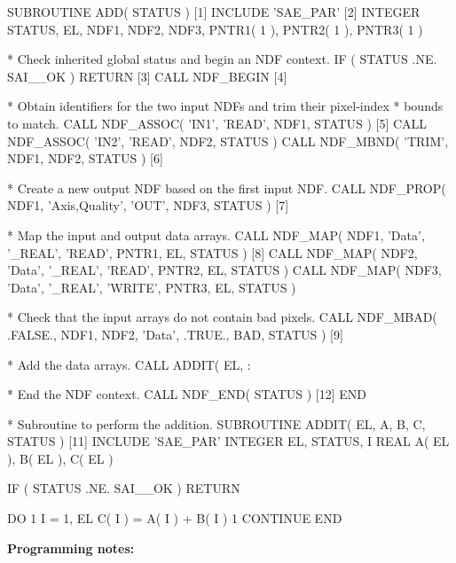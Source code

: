\documentclass[twoside,11pt,nolof]{starlink}
\begin{document}
\small
\begin{terminalv}
      SUBROUTINE ADD( STATUS )                                 [1]
      INCLUDE 'SAE_PAR'                                        [2]
      INTEGER STATUS, EL, NDF1, NDF2, NDF3, PNTR1( 1 ), PNTR2( 1 ), PNTR3( 1 )

*  Check inherited global status and begin an NDF context.
      IF ( STATUS .NE. SAI__OK ) RETURN                        [3]
      CALL NDF_BEGIN                                           [4]

*  Obtain identifiers for the two input NDFs and trim their pixel-index
*  bounds to match.
      CALL NDF_ASSOC( 'IN1', 'READ', NDF1, STATUS )            [5]
      CALL NDF_ASSOC( 'IN2', 'READ', NDF2, STATUS )
      CALL NDF_MBND( 'TRIM', NDF1, NDF2, STATUS )              [6]

*  Create a new output NDF based on the first input NDF.
      CALL NDF_PROP( NDF1, 'Axis,Quality', 'OUT', NDF3, STATUS )  [7]

*  Map the input and output data arrays.
      CALL NDF_MAP( NDF1, 'Data', '_REAL', 'READ', PNTR1, EL, STATUS )  [8]
      CALL NDF_MAP( NDF2, 'Data', '_REAL', 'READ', PNTR2, EL, STATUS )
      CALL NDF_MAP( NDF3, 'Data', '_REAL', 'WRITE', PNTR3, EL, STATUS )

*  Check that the input arrays do not contain bad pixels.
      CALL NDF_MBAD( .FALSE., NDF1, NDF2, 'Data', .TRUE., BAD, STATUS )  [9]

*  Add the data arrays.
      CALL ADDIT( EL, %
     :            %

*  End the NDF context.
      CALL NDF_END( STATUS )                                   [12]
      END


*  Subroutine to perform the addition.
      SUBROUTINE ADDIT( EL, A, B, C, STATUS )                  [11]
      INCLUDE 'SAE_PAR'
      INTEGER EL, STATUS, I
      REAL A( EL ), B( EL ), C( EL )

      IF ( STATUS .NE. SAI__OK ) RETURN

      DO 1 I = 1, EL
         C( I ) = A( I ) + B( I )
 1    CONTINUE
      END
\end{terminalv}
\normalsize

\textbf{Programming notes:}
\end{document}
